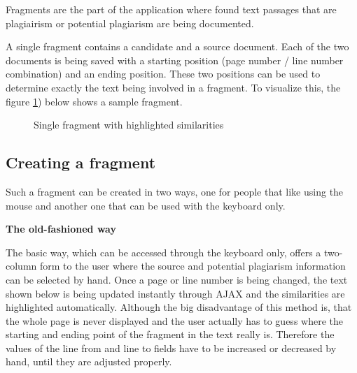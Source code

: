 Fragments are the part of the application where found text passages that are plagiairism or potential plagiarism are being documented.

A single fragment contains a candidate and a source document. Each of the two documents is being saved with a starting position (page number / line number combination) and an ending position. These two positions can be used to determine exactly the text being involved in a fragment. To visualize this, the figure \ref{fig:single-fragment}) below shows a sample fragment.

\begin{figure}[!h]
  \centering
  \caption{Single fragment with highlighted similarities}
  \label{fig:single-fragment}
\end{figure}

\subsection{Creating a fragment}

Such a fragment can be created in two ways, one for people that like using the mouse and another one that can be used with the keyboard only.

\textbf{The old-fashioned way}

The basic way, which can be accessed through the keyboard only, offers a two-column form to the user where the source and potential plagiarism information can be selected by hand. Once a page or line number is being changed, the text shown below is being updated instantly through AJAX and the similarities are highlighted automatically. Although the big disadvantage of this method is, that the whole page is never displayed and the user actually has to guess where the starting and ending point of the fragment in the text really is. Therefore the values of the line from and line to fields have to be increased or decreased by hand, until they are adjusted properly.

